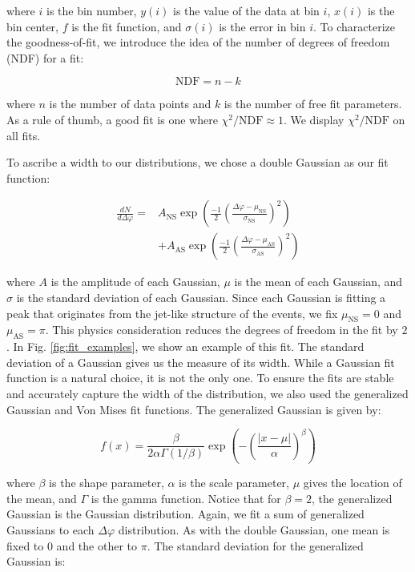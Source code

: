 \documentclass[../main.tex]{subfiles}
\begin{document}
where $i$ is the bin number, $y(i)$ is the value of the data at bin $i$, $x(i)$ is the bin center, $f$ is the fit function, and $\sigma(i)$ is the error in bin $i$. To characterize the goodness-of-fit, we introduce the idea of the number of degrees of freedom (NDF) for a fit:

\begin{equation}
    \text{NDF} = n - k
\end{equation}

where $n$ is the number of data points and $k$ is the number of free fit parameters. As a rule of thumb, a good fit is one where $\chi^2/\text{NDF} \approx 1$. We display $\chi^2/\text{NDF}$ on all fits. 

To ascribe a width to our distributions, we chose a double Gaussian as our fit function:

\begin{align}
    \frac{dN}{d\Delta\varphi} = &A_{\text{NS}} \exp{\left(\frac{-1}{2}\left(\frac{\Delta\varphi-\mu_{\text{NS}}}{\sigma_{\text{NS}}}\right)^2\right)} \\
    &+ A_{\text{AS}} \exp{\left(\frac{-1}{2}\left(\frac{\Delta\varphi-\mu_{\text{AS}}}{\sigma_{\text{AS}}}\right)^2\right)} 
\end{align}

where $A$ is the amplitude of each Gaussian, $\mu$ is the mean of each Gaussian, and $\sigma$ is the standard deviation of each Gaussian. Since each Gaussian is fitting a peak that originates from the jet-like structure of the events, we fix $\mu_{\text{NS}}=0$ and $\mu_{\text{AS}}=\pi$. This physics consideration reduces the degrees of freedom in the fit by $2$. In Fig. \ref{fig:fit_examples}, we show an example of this fit. The standard deviation of a Gaussian gives us the measure of its width. While a Gaussian fit function is a natural choice, it is not the only one. To ensure the fits are stable and accurately capture the width of the distribution, we also used the generalized Gaussian and Von Mises fit functions. The generalized Gaussian is given by: 

\begin{equation}
    f(x) = \frac{\beta}{2\alpha\Gamma(1/\beta)}\exp{\left(-\left(\frac{|x-\mu|}{\alpha}\right)^\beta\right)}
\end{equation}

where $\beta$ is the shape parameter, $\alpha$ is the scale parameter, $\mu$ gives the location of the mean, and $\Gamma$ is the gamma function. Notice that for $\beta=2$, the generalized Gaussian is the Gaussian distribution. Again, we fit a sum of generalized Gaussians to each $\Delta\varphi$ distribution. As with the double Gaussian, one mean is fixed to $0$ and the other to $\pi$. The standard deviation for the generalized Gaussian is: 
\end{document}
